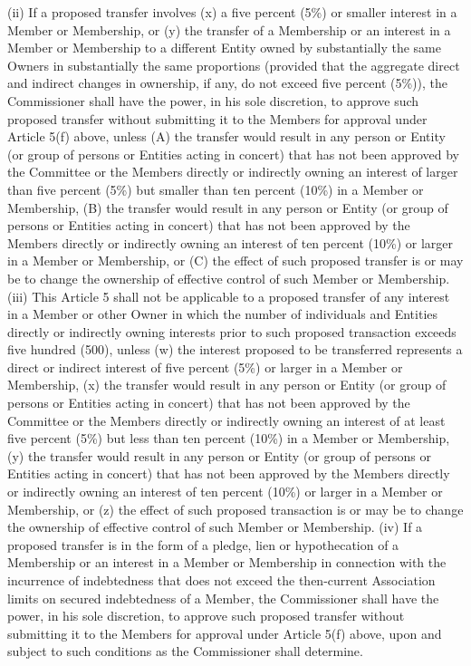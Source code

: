 \documentclass[]{book}
\begin{document}
(ii) If a proposed transfer involves (x) a five percent (5\%) or smaller interest in a Member or Membership, or (y) the transfer of a Membership or an interest in a Member or Membership to a different Entity owned by substantially the same Owners in substantially the same proportions (provided that the aggregate direct and indirect changes in ownership, if any, do not exceed five percent (5\%)), the Commissioner shall have the power, in his sole discretion, to approve such proposed transfer without submitting it to the Members for approval under Article 5(f) above, unless (A) the transfer would result in any person or Entity (or group of persons or Entities acting in concert) that has not been approved by the Committee or the Members directly or indirectly owning an interest of larger than five percent (5\%) but smaller than ten percent (10\%) in a Member or Membership, (B) the transfer would result in any person or Entity (or group of persons or Entities acting in concert) that has not been approved by the Members directly or indirectly owning an interest of ten percent (10\%) or larger in a Member or Membership, or (C) the effect of such proposed transfer is or may be to change the ownership of effective control of such Member or Membership.
(iii) This Article 5 shall not be applicable to a proposed transfer of any interest in a Member or other Owner in which the number of individuals and Entities directly or indirectly owning interests prior to such proposed transaction exceeds five hundred (500), unless (w) the interest proposed to be transferred represents a direct or indirect interest of five percent (5\%) or larger in a Member or Membership, (x) the transfer would result in any person or Entity (or group of persons or Entities acting in concert) that has not been approved by the Committee or the Members directly or indirectly owning an interest of at least five percent (5\%) but less than ten percent (10\%) in a Member or Membership, (y) the transfer would result in any person or Entity (or group of persons or Entities acting in concert) that has not been approved by the Members directly or indirectly owning an interest of ten percent (10\%) or larger in a Member or Membership, or (z) the effect of such proposed transaction is or may be to change the ownership of effective control of such Member or Membership.
(iv) If a proposed transfer is in the form of a pledge, lien or hypothecation of a Membership or an interest in a Member or Membership in connection with the incurrence of indebtedness that does not exceed the then-current Association limits on secured indebtedness of a Member, the Commissioner shall have the power, in his sole discretion, to approve such proposed transfer without submitting it to the Members for approval under Article 5(f) above, upon and subject to such conditions as the Commissioner shall determine.
\end{document}
